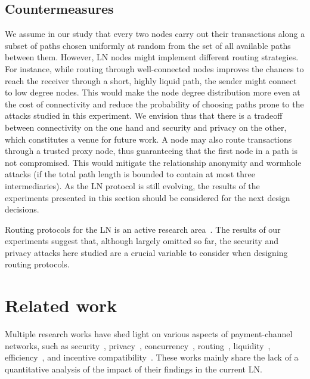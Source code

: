 \subsection{Countermeasures}
We assume in our study that every two nodes carry out their transactions  
along a subset of paths chosen uniformly at random from the set of all available paths between them. 
However, LN nodes might implement different routing strategies. 
For instance, while routing through well-connected nodes improves the chances to reach the receiver through a short, highly liquid path, 
the sender might connect to low degree nodes.
This would make the node degree distribution more even at the cost of connectivity and reduce the probability of choosing paths prone to the 
attacks studied in this experiment. 
We envision thus that there is a tradeoff between connectivity on the one hand and security and privacy on the other,
which constitutes a venue for future work.
A node may also route transactions through a trusted proxy node, 
thus guaranteeing that the first node in a path is not compromised.
This would mitigate the relationship anonymity and wormhole attacks (if the total path length is bounded to contain at most three intermediaries).
As the LN protocol is still evolving, the results of the experiments presented in this section should be considered 
for the next design decisions.

Routing protocols for the LN is an active research area~\cite{Roos2018, Sivaraman2018, Malavolta2017a, Prihodko2016, Grunspan2018, Bagaria2019, Osuntokun2018, Pickhardt2019, ZmnSCPxj2019, ZmnSCPxj2019a, ZmnSCPxj2019b}.
The results of our experiments suggest that, although largely omitted so far, 
the security and privacy attacks here studied are a crucial variable to consider when designing routing protocols. 


\section{Related work}


Multiple research works have shed light on various aspects of payment-channel networks, such as security~\cite{Malavolta2019, Kiayias2019}, privacy~\cite{Malavolta2017, HerreraJoancomarti2019}, concurrency~\cite{Malavolta2017}, routing~\cite{Malavolta2017a, Roos2018, Sivaraman2018, Prihodko2016}, liquidity~\cite{Dandekar2011,MorenoSanchez2018}, efficiency~\cite{Decker2018}, and incentive compatibility~\cite{Engelmann2017}.
These works mainly share the lack of a quantitative analysis of the impact of their findings in the current LN.

